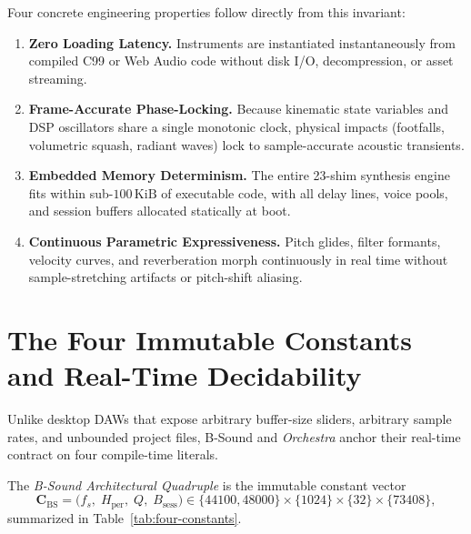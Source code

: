 Four concrete engineering properties follow directly from this invariant:
\begin{enumerate}[leftmargin=1.5em]
  \item \textbf{Zero Loading Latency.} Instruments are instantiated instantaneously from compiled C99 or Web Audio code without disk I/O, decompression, or asset streaming.
  \item \textbf{Frame-Accurate Phase-Locking.} Because kinematic state variables and DSP oscillators share a single monotonic clock, physical impacts (footfalls, volumetric squash, radiant waves) lock to sample-accurate acoustic transients.
  \item \textbf{Embedded Memory Determinism.} The entire 23-shim synthesis engine fits within sub-$100\,\text{KiB}$ of executable code, with all delay lines, voice pools, and session buffers allocated statically at boot.
  \item \textbf{Continuous Parametric Expressiveness.} Pitch glides, filter formants, velocity curves, and reverberation morph continuously in real time without sample-stretching artifacts or pitch-shift aliasing.
\end{enumerate}

\section{The Four Immutable Constants and Real-Time Decidability}

Unlike desktop DAWs that expose arbitrary buffer-size sliders, arbitrary sample rates, and unbounded project files, B-Sound and \emph{Orchestra} anchor their real-time contract on four compile-time literals.

\begin{definition}
The \emph{B-Sound Architectural Quadruple} is the immutable constant vector
\begin{equation}
\mathbf{C}_{\mathrm{BS}} = \big(f_s,\; H_{\mathrm{per}},\; Q,\; B_{\mathrm{sess}}\big)
\in \{44100, 48000\} \times \{1024\} \times \{32\} \times \{73408\},
\end{equation}
summarized in Table~\ref{tab:four-constants}.
\end{definition}

